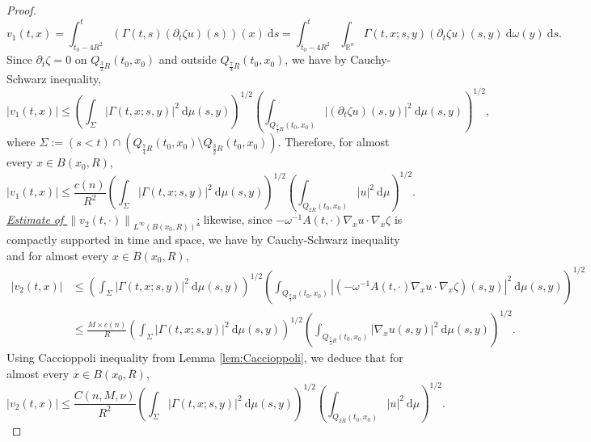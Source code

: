 \documentclass[12pt, letterpaper]{amsart}
\theoremstyle{definition}
\theoremstyle{remark}
\numberwithin{equation}{section}
\begin{document}
\begin{proof}
\begin{equation*}
    v_1(t,x)= \int_{t_0-4R^2}^{t}\left ( \Gamma(t,s)(\partial_t \zeta u)(s) \right )(x) \ \mathrm{d}s = \int_{t_0-4R^2}^{t} \int_{\mathbb{R}^n} \Gamma(t,x;s,y)(\partial_t \zeta u)(s,y) \ \mathrm{d} \omega(y) \ \mathrm ds.
\end{equation*}
Since $\partial_t \zeta = 0 $ on $Q_{\frac{3}{2}R}(t_0,x_0)$ and outside $Q_{\frac{7}{4}R}(t_0,x_0)$, we have by Cauchy-Schwarz inequality, 
\begin{equation*}
    \left | v_1(t,x) \right |\leq \left ( \int_{\Sigma} \left | \Gamma(t,x;s,y) \right |^2 \ \mathrm d\mu(s,y) \right )^{1/2}  \left ( \int_{Q_{\frac{7}{4}R}(t_0,x_0) } \left | (\partial_t \zeta u)(s,y) \right |^2 \ \mathrm d\mu(s,y) \right )^{1/2} ,
\end{equation*}
where $\Sigma:= (s<t)\cap(Q_{\frac{7}{4}R}(t_0,x_0) \setminus Q_{\frac{3}{2}R}(t_0,x_0))$. Therefore, for almost every $x \in B(x_0,R)$,
\begin{equation}\label{1 converse HK}
    \left | v_1(t,x) \right |\leq \frac{c(n)}{R^2}\left ( \int_{\Sigma} \left | \Gamma(t,x;s,y) \right |^2 \ \mathrm d\mu(s,y) \right )^{1/2}  \left ( \int_{Q_{2R}(t_0,x_0) } \left | u \right |^2 \ \mathrm d\mu \right )^{1/2}.
\end{equation}
\underline{\textit{Estimate of $\left\| v_2(t,\cdot) \right\|_{L^\infty(B(x_0,R))}$}:} likewise, since $- \omega^{-1}A(t,\cdot)\nabla_x u \cdot \nabla_x \zeta$ is compactly supported in time and space, we have by Cauchy-Schwarz inequality and for almost every $x \in B(x_0,R)$,
\begin{align*}
    \left | v_2(t,x) \right |&\leq \left ( \int_{\Sigma} \left | \Gamma(t,x;s,y) \right |^2 \ \mathrm d\mu(s,y) \right )^{1/2}  \left ( \int_{Q_{\frac{7}{4}R}(t_0,x_0) } \left | \left ( - \omega^{-1}A(t,\cdot)\nabla_x u \cdot \nabla_x \zeta \right )(s,y) \right |^2 \ \mathrm d\mu(s,y) \right )^{1/2}\\
    &\leq \frac{M \times c(n)}{R} \left ( \int_{\Sigma} \left | \Gamma(t,x;s,y) \right |^2 \ \mathrm d\mu(s,y) \right )^{1/2}  \left ( \int_{Q_{\frac{7}{4}R}(t_0,x_0) } \left | \nabla_x u (s,y) \right |^2 \ \mathrm d\mu(s,y) \right )^{1/2}.
\end{align*}
Using Caccioppoli inequality from Lemma \ref{lem:Caccioppoli}, we deduce that for almost every $x \in B(x_0,R)$,
\begin{equation}\label{2 Convers HK}
    \left | v_2(t,x) \right |\leq \frac{C(n,M,\nu)}{R^2} \left ( \int_{\Sigma} \left | \Gamma(t,x;s,y) \right |^2 \ \mathrm d\mu(s,y) \right )^{1/2}  \left ( \int_{Q_{2R}(t_0,x_0) } \left |  u  \right |^2 \ \mathrm d\mu \right )^{1/2}.

\end{equation}
\end{proof}
\end{document}
